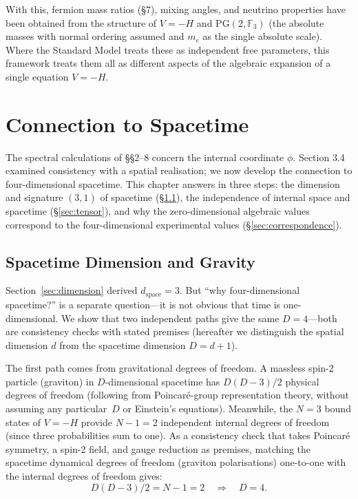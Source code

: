 \documentclass[12pt,a4paper]{article}
\begin{document}
With this, fermion mass ratios (\S7), mixing angles, and neutrino properties have been obtained from the structure of $V = -H$ and $\mathrm{PG}(2, \mathbb{F}_3)$ (the absolute masses with normal ordering assumed and $m_e$ as the single absolute scale). Where the Standard Model treats these as independent free parameters, this framework treats them all as different aspects of the algebraic expansion of a single equation $V = -H$.



\section{Connection to Spacetime}\label{sec:4d}

The spectral calculations of \S\S2--8 concern the internal coordinate $\phi$.
Section 3.4 examined consistency with a spatial realisation;
we now develop the connection to four-dimensional spacetime.
This chapter answers in three steps: the dimension and signature $(3,1)$ of spacetime
(\S\ref{sec:spacetime-dim}), the independence of internal space
and spacetime (\S\ref{sec:tensor}), and why the zero-dimensional
algebraic values correspond to the four-dimensional experimental
values (\S\ref{sec:correspondence}).

\subsection{Spacetime Dimension and Gravity}\label{sec:spacetime-dim}

Section~\ref{sec:dimension} derived $d_\mathrm{space} = 3$. But ``why four-dimensional spacetime?'' is a separate question---it is not obvious that time is one-dimensional. We show that two independent paths give the same $D = 4$---both are consistency checks with stated premises (hereafter we distinguish the spatial dimension $d$ from the spacetime dimension $D = d + 1$).

The first path comes from gravitational degrees of freedom. A massless spin-2 particle (graviton) in $D$-dimensional spacetime has $D(D{-}3)/2$ physical degrees of freedom (following from Poincar\'e-group representation theory, without assuming any particular~$D$ or Einstein's equations). Meanwhile, the $N = 3$ bound states of $V = -H$ provide $N{-}1 = 2$ independent internal degrees of freedom (since three probabilities sum to one). As a consistency check that takes Poincar\'e symmetry, a spin-2 field, and gauge reduction as premises, matching the spacetime dynamical degrees of freedom (graviton polarisations) one-to-one with the internal degrees of freedom gives:
\begin{equation}
  D(D{-}3)/2 = N - 1 = 2 \quad\Longrightarrow\quad D = 4.
\end{equation}
\end{document}
